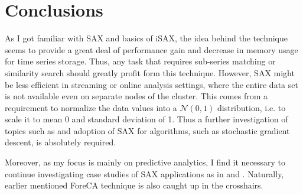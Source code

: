 \documentclass{article}
\begin{document}
\section{Conclusions}
As I got familiar with SAX and basics of iSAX, the idea behind the technique seems to provide a great deal of performance gain and decrease in memory usage for time series storage. Thus, any task that requires sub-series matching or similarity search should greatly profit form this technique. However, SAX might be less efficient in streaming or online analysis settings, where the entire data set is not available even on separate nodes of the cluster. This comes from a requirement to normalize the data values into a $\mathcal{N}(0, 1)$ distribution, i.e. to scale it to mean 0 and standard deviation of 1. Thus a further investigation of topics such as \cite{lin2003symbolic} and adoption of SAX for algorithms, such as stochastic gradient descent, is absolutely required.\par
Moreover, as my focus is mainly on predictive analytics, I find it necessary to continue investigating case studies of SAX applications as in \cite{vzliobaite2012beating} and \cite{morgan2009predicting}. Naturally, earlier mentioned ForeCA technique is also caught up in the crosshairs.



\end{document}
